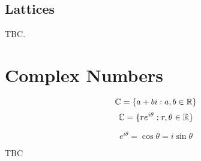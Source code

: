\documentclass[openany]{report}
\begin{document}
\subsection{Lattices}
TBC.
\begin{center}
    \textbf{}
\end{center}
\section{Complex Numbers}
$$\mathbb{C} = \{a + bi : a,b \in \mathbb{R}\}$$
$$\mathbb{C} = \{re^{i\theta} : r, \theta \in \mathbb{R}\}$$
\begin{lemma}
    $$e^{i\theta} = \cos\theta = i\sin\theta$$
\end{lemma}
TBC
\end{document}
